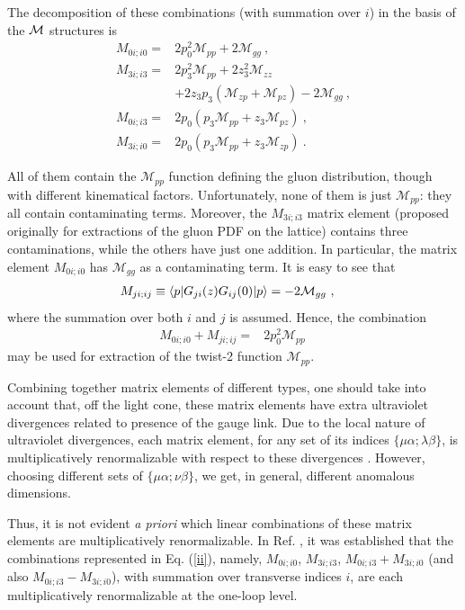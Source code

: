 The decomposition of these combinations (with summation over $i$) in the basis of the ${\cal M}$ structures is
\begin{align}
{ M}_{0 i; i 0 } = & 2 p_0^2 \mathcal{M}_{pp} +2 \mathcal{M}_{gg} \ , \\
{ M}_{3 i; i 3 } = &2 p_3^2 \mathcal{M}_{pp}+2 z_3^2 \mathcal{M}_{zz} \nonumber \\ &
+2 z_3 p_3 \left( \mathcal{M}_{zp} + \mathcal{M}_{pz} \right) - 2\mathcal{M}_{gg} \ ,
\\
{ M}_{0 i; i 3 } = & 2 p_0 \left( p_3 \mathcal{M}_{pp} + z_3 \mathcal{M}_{pz} \right) \ ,
\\
{ M}_{3 i; i 0 } = & 2 p_0 \left( p_3 \mathcal{M}_{pp} + z_3 \mathcal{M}_{zp} \right) \ .
\end{align}

All of them contain the $\mathcal{M}_{pp}$ function defining the gluon
distribution, though with different kinematical factors.
Unfortunately, none of them is just $\mathcal{M}_{pp}$: they all contain
contaminating terms.
Moreover, the ${ M}_{3 i; i 3}$ matrix element (proposed
originally \cite{Ji:2013dva} for extractions of the gluon PDF on the lattice)
contains three contaminations, while the others have
just one addition.
In particular, the matrix element ${ M}_{0 i; i 0}$ has $\mathcal{M}_{gg}$ as a contaminating term.
It is easy to see that
\begin{align}
{ M}_{j i ; ij} \equiv \langle p\rvert G_{j i} (z) G_{ij}(0) \lvert p\rangle &= -2 \mathcal{M}_{gg} \ ,
\end{align}
where the summation over both $i$ and $j$ is assumed. Hence, the combination
\begin{align}
{ M}_{0 i; i 0} + { M}_{j i ; i j } = & 2 p_0^2 \mathcal{M}_{pp} \
\label{00m}
\end{align}
may be used for extraction
of the twist-2 function $\mathcal{M}_{pp}$.

Combining together matrix elements of different types, one should
take into account
that,
off the light cone, these matrix elements have extra ultraviolet divergences
related to presence of the gauge link.
Due to the local nature of ultraviolet divergences,
each matrix element, for any set of its indices $\{\mu \alpha; \lambda \beta\}$,
is multiplicatively renormalizable with respect to these divergences \cite{Li:2018tpe}.
However, choosing different sets of $\{\mu \alpha; \nu \beta\}$, we get, in general, different
anomalous dimensions.

Thus, it is not evident {\it a priori} which linear combinations of these
matrix elements are multiplicatively renormalizable.
In Ref. \cite{Zhang:2018diq}, it was established that the combinations represented in Eq. (\ref{ii}), namely,
${ M}_{0 i; i 0}$, ${ M}_{3 i; i 3}$, \mbox{${ M}_{0 i; i3} +
{ M}_{3 i; i 0}$} (and also \mbox{${ M}_{0 i; i 3} -
{ M}_{3 i; i 0}$}), with
summation over transverse indices $i$,
are each multiplicatively renormalizable at the one-loop level.

